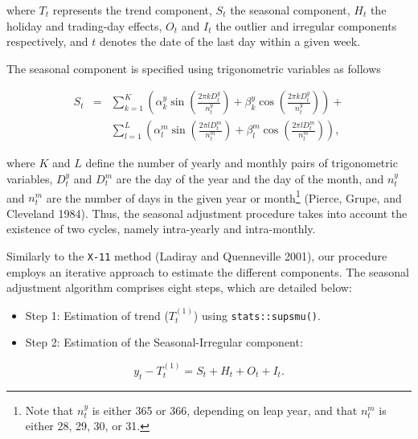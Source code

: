 where \(T_{t}\) represents the trend component, \(S_{t}\) the seasonal component, \(H_{t}\) the holiday and trading-day effects, \(O_{t}\) and \(I_{t}\) the outlier and irregular components respectively, and \(t\) denotes the date of the last day within a given week.

The seasonal component is specified using trigonometric variables as follows

\begin{eqnarray}
S_{t} &=&\sum_{k=1}^{K}\left( \alpha _{k}^{y}\sin (\frac{2\pi kD_{t}^{y}}{
n_{t}^{y}})+\beta _{k}^{y}\cos (\frac{2\pi kD_{t}^{y}}{n_{t}^{y}})\right) + \nonumber
\\
&&\sum_{l=1}^{L}\left( \alpha _{l}^{m}\sin (\frac{2\pi lD_{t}^{m}}{n_{t}^{m}}
)+\beta _{l}^{m}\cos (\frac{2\pi lD_{t}^{m}}{n_{t}^{m}})\right) ,
\label{eq:seqscomp}
\end{eqnarray}

where \(K\) and \(L\) define the number of yearly and monthly pairs of trigonometric variables, \(D_{t}^{y}\) and \(D_{t}^{m}\) are the day of the year and the day of the
month, and \(n_{t}^{y}\) and \(n_{t}^{m}\) are the number of days in the given
year or month\footnote{Note that \(n^y_t\) is either 365 or 366, depending on leap year, and that \(n^m_t\) is either 28, 29, 30, or 31.} (Pierce, Grupe, and Cleveland 1984). Thus, the seasonal adjustment procedure takes into account the existence of two cycles, namely intra-yearly and intra-monthly.

Similarly to the \texttt{X-11} method (Ladiray and Quenneville 2001), our procedure employs an iterative approach to estimate the different components. The seasonal adjustment algorithm comprises eight steps, which are detailed below:

\begin{itemize}
\item
  Step 1: Estimation of trend (\(T_{t}^{(1)}\)) using \texttt{stats::supsmu()}.
\item
  Step 2: Estimation of the Seasonal-Irregular component:
\end{itemize}

\begin{equation*}
    y_{t}-T_{t}^{(1)}=S_{t}+H_{t}+O_{t}+I_{t}.
\end{equation*}

